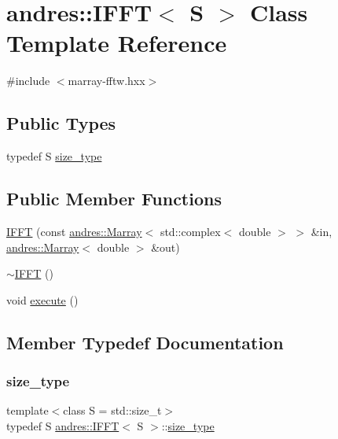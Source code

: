 \hypertarget{classandres_1_1IFFT}{}\section{andres\+:\+:I\+F\+FT$<$ S $>$ Class Template Reference}
\label{classandres_1_1IFFT}


{\ttfamily \#include $<$marray-\/fftw.\+hxx$>$}

\subsection*{Public Types}
\begin{DoxyCompactItemize}
\item 
typedef S \hyperlink{classandres_1_1IFFT_a15dbc48e17ab7f5f8de2fcdd507eaba5}{size\+\_\+type}
\end{DoxyCompactItemize}
\subsection*{Public Member Functions}
\begin{DoxyCompactItemize}
\item 
\hyperlink{classandres_1_1IFFT_ab99387b8042cb2f7748ff735fa227d34}{I\+F\+FT} (const \hyperlink{classandres_1_1Marray}{andres\+::\+Marray}$<$ std\+::complex$<$ double $>$ $>$ \&in, \hyperlink{classandres_1_1Marray}{andres\+::\+Marray}$<$ double $>$ \&out)
\item 
\hyperlink{classandres_1_1IFFT_a01d5f0a0d262ee285b0517559418cf97}{$\sim$\+I\+F\+FT} ()
\item 
void \hyperlink{classandres_1_1IFFT_aa73b7f9e34a4e62f6d2ff244a656dc71}{execute} ()
\end{DoxyCompactItemize}


\subsection{Member Typedef Documentation}
\mbox{\label{classandres_1_1IFFT_a15dbc48e17ab7f5f8de2fcdd507eaba5}} 
\subsubsection{\texorpdfstring{size\+\_\+type}{size\_type}}
{\footnotesize\ttfamily template$<$class S  = std\+::size\+\_\+t$>$ \\
typedef S \hyperlink{classandres_1_1IFFT}{andres\+::\+I\+F\+FT}$<$ S $>$\+::\hyperlink{classandres_1_1IFFT_a15dbc48e17ab7f5f8de2fcdd507eaba5}{size\+\_\+type}}



